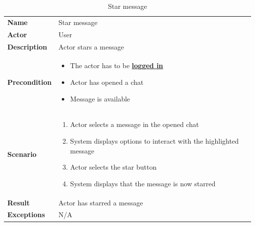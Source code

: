 \begin{table}[ht]
    \caption{Star message}
    \begin{tabular}{|L{5cm}|L{10cm}|}
        \toprule
        \textbf{Name}        & Star message                \\
        \textbf{Actor}       & User                        \\
        \textbf{Description} & Actor stars a message       \\
        \textbf{Precondition} &
        \vspace{-0.75cm}
        \begin{itemize}
            \setlength\itemsep{-0.5em}
            \item The actor has to be \textbf{\hyperref[tab:table8]{logged in}}
            \item Actor has opened a chat
            \item Message is available
        \end{itemize} \\[-0.5cm]
        \textbf{Scenario} &
        \vspace{-0.75cm}
        \begin{enumerate}
            \setlength\itemsep{-0.5em}
            \item Actor selects a message in the opened chat
            \item System displays options to interact with the highlighted message
            \item Actor selects the star button
            \item System displays that the message is now starred
        \end{enumerate} \\[-0.5cm]
        \textbf{Result}      & Actor has starred a message \\
        \textbf{Exceptions}  & N/A                         \\
        \bottomrule
    \end{tabular}
    \label{tab:table22}
\end{table}

